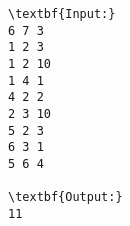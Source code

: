 \begin{verbatim}
\textbf{Input:}
6 7 3
1 2 3
1 2 10
1 4 1
4 2 2
2 3 10
5 2 3
6 3 1
5 6 4

\textbf{Output:}
11

\end{verbatim}
